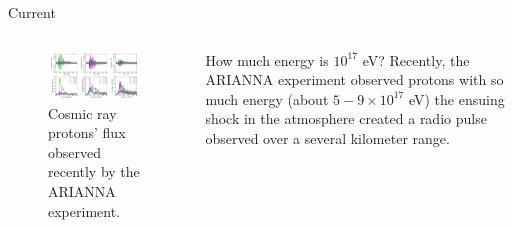 \documentclass{beamer}
\begin{document}
\begin{frame}{Current}
\begin{columns}[T]
\begin{column}{0.5\textwidth}
\begin{figure}
\centering
\includegraphics[width=0.95\textwidth]{figures/ARIANNA2.png}
\caption{\label{fig:ARIANNA2} Cosmic ray protons' flux observed recently by the ARIANNA experiment.}
\end{figure}
\end{column}
\begin{column}{0.5\textwidth}
\small
How much energy is $10^{17}$ eV?  Recently, the ARIANNA experiment observed protons with so much energy (about $5-9 \times 10^{17}$ eV) the ensuing shock in the atmosphere created a radio pulse observed over a several kilometer range.
\end{column}
\end{columns}
\end{frame}
\end{document}
